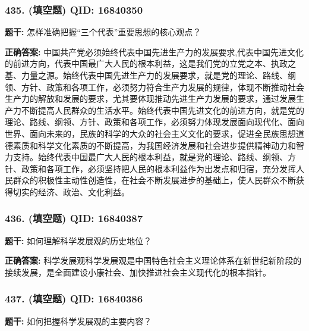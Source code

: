 \documentclass[12pt,UTF8]{ctexart}
\begin{document}
\vspace{0.3em}\hrulefill\vspace{0.7em}

\subsubsection*{435. (填空题) \small QID: 16840350}

\textbf{题干:}
怎样准确把握“三个代表”重要思想的核心观点？

\textbf{正确答案:}
中国共产党必须始终代表中国先进生产力的发展要求,代表中国先进文化的前进方向，代表中国最广大人民的根本利益，这是我们党的立党之本、执政之基、力量之源。始终代表中国先进生产力的发展要求，就是党的理论、路线、纲领、方针、政策和各项工作，必须努力符合生产力发展的规律，体现不断推动社会生产力的解放和发展的要求，尤其要体现推动先进生产力发展的要求，通过发展生产力不断提高人民群众的生活水平。始终代表中国先进文化的前进方向，就是党的理论、路线、纲领、方针、政策和各项工作，必须努力体现发展面向现代化、面向世界、面向未来的，民族的科学的大众的社会主义文化的要求，促进全民族思想道德素质和科学文化素质的不断提高，为我国经济发展和社会进步提供精神动力和智力支持。始终代表中国最广大人民的根本利益，就是党的理论、路线、纲领、方针、政策和各项工作，必须坚持把人民的根本利益作为出发点和归宿，充分发挥人民群众的积极性主动性创造性，在社会不断发展进步的基础上，使人民群众不断获得切实的经济、政治、文化利益。

\vspace{0.3em}\hrulefill\vspace{0.7em}

\subsubsection*{436. (填空题) \small QID: 16840387}

\textbf{题干:}
如何理解科学发展观的历史地位？

\textbf{正确答案:}
科学发展观科学发展观是中国特色社会主义理论体系在新世纪新阶段的接续发展，是全面建设小康社会、加快推进社会主义现代化的根本指针。

\vspace{0.3em}\hrulefill\vspace{0.7em}

\subsubsection*{437. (填空题) \small QID: 16840386}

\textbf{题干:}
如何把握科学发展观的主要内容？
\end{document}

